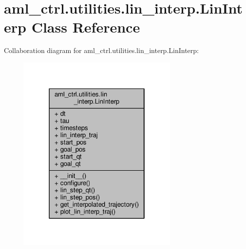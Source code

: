 \hypertarget{classaml__ctrl_1_1utilities_1_1lin__interp_1_1_lin_interp}{\section{aml\-\_\-ctrl.\-utilities.\-lin\-\_\-interp.\-Lin\-Interp Class Reference}
\label{classaml__ctrl_1_1utilities_1_1lin__interp_1_1_lin_interp}
}


Collaboration diagram for aml\-\_\-ctrl.\-utilities.\-lin\-\_\-interp.\-Lin\-Interp\-:
\nopagebreak
\begin{figure}[H]
\begin{center}
\leavevmode
\includegraphics[width=226pt]{classaml__ctrl_1_1utilities_1_1lin__interp_1_1_lin_interp__coll__graph}
\end{center}
\end{figure}
